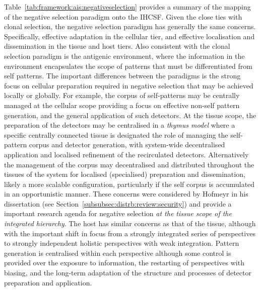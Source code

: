 Table~\ref{tab:framework:ais:negativeselection} provides a summary of the mapping of the negative selection paradigm onto the IHCSF. Given the close ties with clonal selection, the negative selection paradigm has generally the same concerns. Specifically, effective adaptation in the cellular tier, and effective localisation and dissemination in the tissue and host tiers. 
Also consistent with the clonal selection paradigm is the antigenic environment, where the information in the environment encapsulates the scope of patterns that must be differentiated from self patterns. 
The important differences between the paradigms is the strong focus on cellular preparation required in negative selection that may be achieved locally or globally. 
For example, the corpus of self-patterns may be centrally managed at the cellular scope providing a focus on effective non-self pattern generation, and the general application of such detectors.
At the tissue scope, the preparation of the detectors may be centralised in a \emph{thymus model} where a specific centrally connected tissue is designated the role of managing the self-pattern corpus and detector generation, with system-wide decentralised application and localised refinement of the recirculated detectors. Alternatively the management of the corpus may decentralised and distributed throughout the tissues of the system for localised (specialised) preparation and dissemination, likely a more scalable configuration, particularly if the self corpus is accumulated in an opportunistic manner. These concerns were considered by Hofmeyr in his dissertation (see Section~\ref{subsubsec:distrb:review:security}) and provide a important research agenda for negative selection \emph{at the tissue scope of the integrated hierarchy}. 
The host has similar concerns as that of the tissue, although with the important shift in focus from a strongly integrated series of perspectives to strongly independent holistic perspectives with weak integration. Pattern generation is centralised within each perspective although some control is provided over the exposure to information, the restarting of perspectives with biasing, and the long-term adaptation of the structure and processes of detector preparation and application.

%
%
